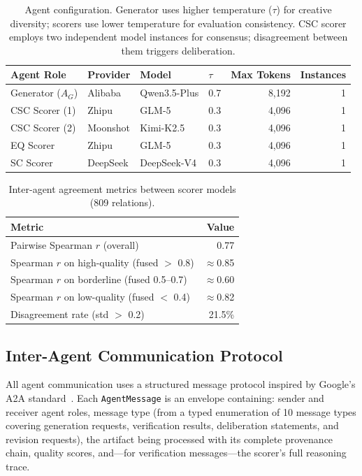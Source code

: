 \documentclass[sigconf]{acmart}
\begin{document}
\begin{table}[t]
\caption{Agent configuration. Generator uses higher temperature ($\tau$) for creative diversity; scorers use lower temperature for evaluation consistency. CSC scorer employs two independent model instances for consensus; disagreement between them triggers deliberation.}
\label{tab:agents}
\centering
\begin{tabular}{l l l l r r}
\toprule
Agent Role & Provider & Model & $\tau$ & Max Tokens & Instances \\
\midrule
Generator ($A_G$) & Alibaba & Qwen3.5-Plus & 0.7 & 8,192 & 1 \\
CSC Scorer (1) & Zhipu & GLM-5 & 0.3 & 4,096 & 1 \\
CSC Scorer (2) & Moonshot & Kimi-K2.5 & 0.3 & 4,096 & 1 \\
EQ Scorer & Zhipu & GLM-5 & 0.3 & 4,096 & 1 \\
SC Scorer & DeepSeek & DeepSeek-V4 & 0.3 & 4,096 & 1 \\
\bottomrule
\end{tabular}
\end{table}

\begin{table}[t]
\caption{Inter-agent agreement metrics between scorer models (809 relations).}
\label{tab:agreement}
\centering
\begin{tabular}{l r}
\toprule
Metric & Value \\
\midrule
Pairwise Spearman $r$ (overall) & 0.77 \\
Spearman $r$ on high-quality (fused $>$ 0.8) & $\approx$0.85 \\
Spearman $r$ on borderline (fused 0.5--0.7) & $\approx$0.60 \\
Spearman $r$ on low-quality (fused $<$ 0.4) & $\approx$0.82 \\
Disagreement rate (std $>$ 0.2) & 21.5\% \\
\bottomrule
\end{tabular}
\end{table}

\subsection{Inter-Agent Communication Protocol}

All agent communication uses a structured message protocol inspired by Google's A2A standard~\cite{wang2025masllm}. Each \texttt{AgentMessage} is an envelope containing: sender and receiver agent roles, message type (from a typed enumeration of 10 message types covering generation requests, verification results, deliberation statements, and revision requests), the artifact being processed with its complete provenance chain, quality scores, and---for verification messages---the scorer's full reasoning trace.
\end{document}
